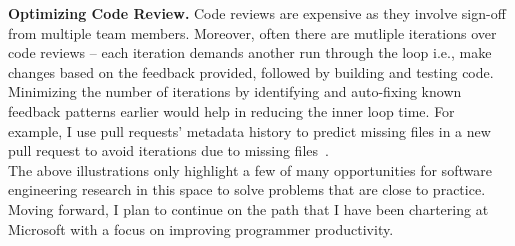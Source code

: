 \documentclass[a4paper]{article}
\begin{document}
\noindent \textbf{Optimizing Code Review.}  Code reviews are expensive as they involve sign-off from multiple team members. Moreover, often there are mutliple iterations over code reviews -- each iteration demands another run through the loop i.e., make changes based on the feedback provided, followed by building and testing code. Minimizing the number of iterations by identifying and auto-fixing known feedback patterns earlier would help in reducing the inner loop time. For example, I use pull requests' metadata history to predict missing files in a new pull request to avoid iterations due to missing files~\cite{prrecommender}.  \\

The above illustrations only highlight a few of many opportunities for software engineering research in this space to solve problems that are close to practice. Moving forward, I plan to continue on the path that I have been chartering at Microsoft with a focus on improving programmer productivity.
















\end{document}
